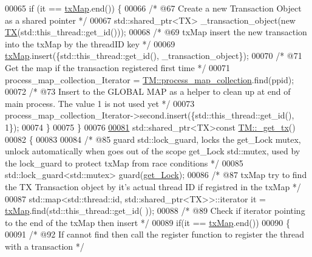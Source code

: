 \begin{DoxyCode}
00065     \textcolor{keywordflow}{if} (it == \hyperlink{class_t_m_a0333dfa193ea99d7626de74a2b932e9b_a0333dfa193ea99d7626de74a2b932e9b}{txMap}.end()) \{
00066         \textcolor{comment}{/* @67 Create a new Transaction Object as a shared pointer */}
00067         std::shared\_ptr<TX> \_transaction\_object(\textcolor{keyword}{new} \hyperlink{class_t_x}{TX}(std::this\_thread::get\_id()));
00068         \textcolor{comment}{/* @69 txMap insert the new transaction into the txMap by the threadID key */}
00069         \hyperlink{class_t_m_a0333dfa193ea99d7626de74a2b932e9b_a0333dfa193ea99d7626de74a2b932e9b}{txMap}.insert(\{std::this\_thread::get\_id(), \_transaction\_object\});
00070         \textcolor{comment}{/* @71 Get the map if the transaction registered first time */}
00071         process\_map\_collection\_Iterator = \hyperlink{class_t_m_a6d417b18213968da2a70a914e80d639b_a6d417b18213968da2a70a914e80d639b}{TM::process\_map\_collection}.find(ppid);
00072         \textcolor{comment}{/* @73 Insert to the GLOBAL MAP as a helper to clean up at end of main process. The value 1 is not
       used yet */}
00073         process\_map\_collection\_Iterator->second.insert(\{std::this\_thread::get\_id(), 1\});
00074     \}
00075 \}
00076 
\hypertarget{_t_m_8cpp_source.tex_l00081}{}\hyperlink{class_t_m_a41cb0226cc4080c931651b13f74a0075_a41cb0226cc4080c931651b13f74a0075}{00081} std::shared\_ptr<TX>\textcolor{keyword}{const} \hyperlink{class_t_m_a41cb0226cc4080c931651b13f74a0075_a41cb0226cc4080c931651b13f74a0075}{TM::\_get\_tx}()
00082 \{
00083    
00084     \textcolor{comment}{/* @85 guard std::lock\_guard, locks the get\_Lock mutex, unlock automatically when goes out of the scope
       get\_Lock std::mutex, used by the lock\_guard to protect txMap from race conditions */}
00085     std::lock\_guard<std::mutex> guard(\hyperlink{class_t_m_a123bc5aa0766a7b909bebc54a429e5b0_a123bc5aa0766a7b909bebc54a429e5b0}{get\_Lock});
00086     \textcolor{comment}{/* @87 txMap try to find the TX Transaction object by it's actual thread ID if registred in the txMap 
      */}
00087     std::map<std::thread::id, std::shared\_ptr<TX>>::iterator it = \hyperlink{class_t_m_a0333dfa193ea99d7626de74a2b932e9b_a0333dfa193ea99d7626de74a2b932e9b}{txMap}.find(std::this\_thread::get\_id(
      ));
00088     \textcolor{comment}{/* @89 Check if iterator pointing to the end of the txMap then insert */}
00089     \textcolor{keywordflow}{if}(it == \hyperlink{class_t_m_a0333dfa193ea99d7626de74a2b932e9b_a0333dfa193ea99d7626de74a2b932e9b}{txMap}.end())
00090     \{
00091       \textcolor{comment}{/* @92 If cannot find then call the register function to register the thread with a transaction */}

\end{DoxyCode}
